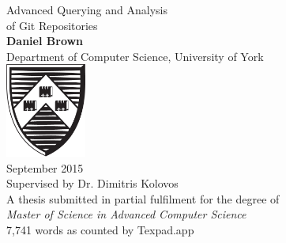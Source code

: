 \documentclass[11pt]{book}
\begin{document}
\begin{titlepage}
	\begin{center}
		{\huge Advanced Querying and Analysis\\ of Git Repositories\\}
		\vspace{1.5cm}
		{\Large \textbf{Daniel Brown} \\}
		{\Large Department of Computer Science, University of York \\}
		\vspace{1.5cm}
		\includegraphics[width=100px]{images/university-of-york-shield} \\
		\vspace{1.5cm}
		{\Large September 2015 \\}
		\vspace{1.5cm}
		\Large Supervised by Dr. Dimitris Kolovos \\
		\vspace{1.5cm}
		\Large A thesis submitted in partial fulfilment for the degree of \\ \textit{Master of Science in Advanced Computer Science}\\
		\vspace{5cm}
		\small 7,741 words as counted by Texpad.app
	\end{center}
	\restoregeometry
\end{titlepage}
\end{document}
